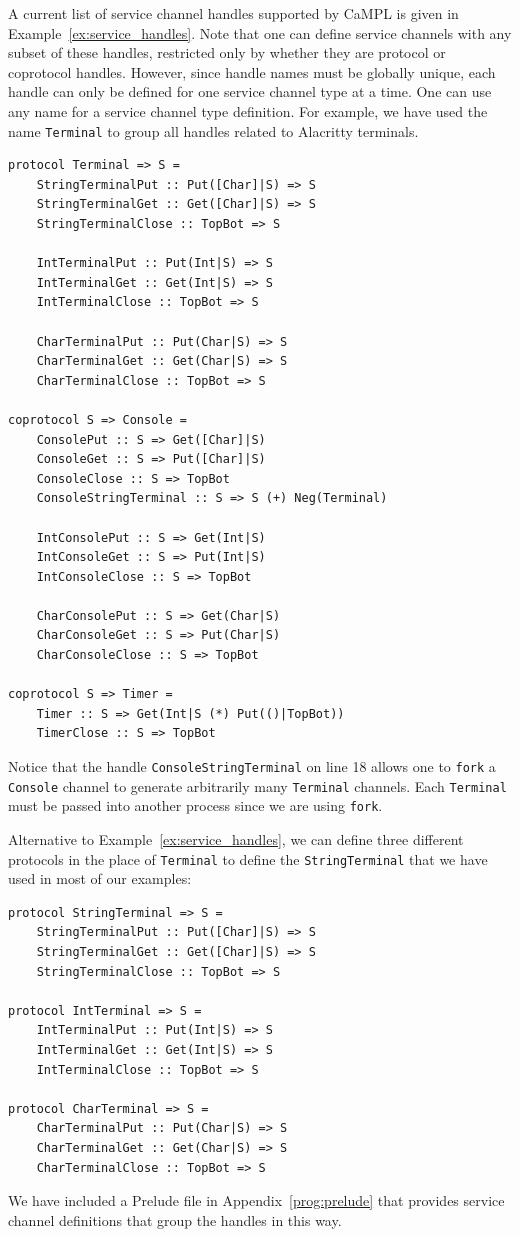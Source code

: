 \documentclass[acmsmall]{acmart}
\begin{document}
A current list of service channel handles supported by CaMPL is given in Example~\ref{ex:service_handles}.
Note that one can define service channels with any subset of these handles, restricted only by whether they are protocol or coprotocol handles.
However, since handle names must be globally unique, each handle can only be defined for one service channel type at a time.
One can use any name for a service channel type definition.
For example, we have used the name \lstinline{Terminal} to group all handles related to Alacritty terminals.
\begin{lstlisting}[label=ex:service_handles, caption=Complete list of service channel handles]
protocol Terminal => S =
    StringTerminalPut :: Put([Char]|S) => S
    StringTerminalGet :: Get([Char]|S) => S 
    StringTerminalClose :: TopBot => S
    
    IntTerminalPut :: Put(Int|S) => S
    IntTerminalGet :: Get(Int|S) => S 
    IntTerminalClose :: TopBot => S

    CharTerminalPut :: Put(Char|S) => S
    CharTerminalGet :: Get(Char|S) => S 
    CharTerminalClose :: TopBot => S

coprotocol S => Console =
    ConsolePut :: S => Get([Char]|S) 
    ConsoleGet :: S => Put([Char]|S) 
    ConsoleClose :: S => TopBot 
    ConsoleStringTerminal :: S => S (+) Neg(Terminal)

    IntConsolePut :: S => Get(Int|S) 
    IntConsoleGet :: S => Put(Int|S) 
    IntConsoleClose :: S => TopBot 

    CharConsolePut :: S => Get(Char|S) 
    CharConsoleGet :: S => Put(Char|S) 
    CharConsoleClose :: S => TopBot 

coprotocol S => Timer =
    Timer :: S => Get(Int|S (*) Put(()|TopBot))
    TimerClose :: S => TopBot 
\end{lstlisting} 
Notice that the handle \lstinline{ConsoleStringTerminal} on line 18 allows one to \lstinline{fork} a \lstinline{Console} channel to generate arbitrarily many \lstinline{Terminal} channels.
Each \lstinline{Terminal} must be passed into another process since we are using \lstinline{fork}.

Alternative to Example~\ref{ex:service_handles}, we can define three different protocols in the place of \lstinline{Terminal} to define the \lstinline{StringTerminal} that we have used in most of our examples:
\begin{lstlisting}[label=ex:terminal_handles, caption=Three kinds of Terminals]
protocol StringTerminal => S =
    StringTerminalPut :: Put([Char]|S) => S
    StringTerminalGet :: Get([Char]|S) => S 
    StringTerminalClose :: TopBot => S

protocol IntTerminal => S =
    IntTerminalPut :: Put(Int|S) => S
    IntTerminalGet :: Get(Int|S) => S 
    IntTerminalClose :: TopBot => S

protocol CharTerminal => S =
    CharTerminalPut :: Put(Char|S) => S
    CharTerminalGet :: Get(Char|S) => S 
    CharTerminalClose :: TopBot => S
\end{lstlisting} 
We have included a Prelude file in Appendix~\ref{prog:prelude} that provides service channel definitions that group the handles in this way.
\end{document}
